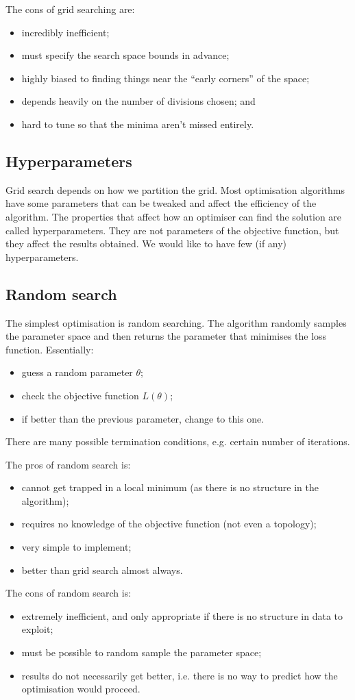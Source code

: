 \documentclass[a4paper, openany]{memoir}
\begin{document}
The cons of grid searching are:
\begin{itemize}
    \item incredibly inefficient;
    \item must specify the search space bounds in advance;
    \item highly biased to finding things near the ``early corners'' of the space;
    \item depends heavily on the number of divisions chosen; and
    \item hard to tune so that the minima aren't missed entirely.
\end{itemize}

\subsection{Hyperparameters}
Grid search depends on how we partition the grid. Most optimisation algorithms have some parameters that can be tweaked and affect the efficiency of the algorithm. The properties that affect how an optimiser can find the solution are called hyperparameters. They are not parameters of the objective function, but they affect the results obtained. We would like to have few (if any) hyperparameters.

\subsection{Random search}
The simplest optimisation is random searching. The algorithm randomly samples the parameter space and then returns the parameter that minimises the loss function. Essentially:
\begin{itemize}
    \item guess a random parameter $\theta$;
    \item check the objective function $L(\theta)$;
    \item if better than the previous parameter, change to this one.
\end{itemize}
There are many possible termination conditions, e.g. certain number of iterations.

The pros of random search is:
\begin{itemize}
    \item cannot get trapped in a local minimum (as there is no structure in the algorithm);
    \item requires no knowledge of the objective function (not even a topology);
    \item very simple to implement;
    \item better than grid search almost always.
\end{itemize}
The cons of random search is:
\begin{itemize}
    \item extremely inefficient, and only appropriate if there is no structure in data to exploit;
    \item must be possible to random sample the parameter space;
    \item results do not necessarily get better, i.e. there is no way to predict how the optimisation would proceed.
\end{itemize}
\end{document}
